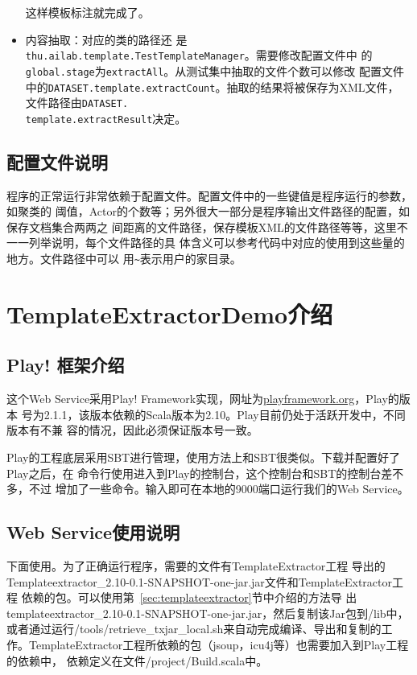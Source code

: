 \documentclass{article}
\begin{document}
\begin{itemize}
  这样模板标注就完成了。
\item 内容抽取：对应的类的路径还
  是\texttt{thu.ailab.template.TestTemplateManager}。需要修改配置文件中
  的\texttt{global.stage}为\texttt{extractAll}。从测试集中抽取的文件个数可以修改
  配置文件中的\texttt{DATASET.template.extractCount}。抽取的结果将被保存为XML文件，
  文件路径由\texttt{DATASET.\\template.extractResult}决定。
\end{itemize}

\subsection{配置文件说明}
程序的正常运行非常依赖于配置文件。配置文件中的一些键值是程序运行的参数，如聚类的
阈值，Actor的个数等；另外很大一部分是程序输出文件路径的配置，如保存文档集合两两之
间距离的文件路径，保存模板XML的文件路径等等，这里不一一列举说明，每个文件路径的具
体含义可以参考代码中对应的使用到这些量的地方。文件路径中可以
用\texttt{\textasciitilde{}}表示用户的家目录。

\section{TemplateExtractorDemo介绍}
\label{sec:templ}

\subsection{Play! 框架介绍}
\label{sec:play}
这个Web Service采用Play! Framework实现，网址为\url{playframework.org}，Play的版本
号为2.1.1，该版本依赖的Scala版本为2.10。Play目前仍处于活跃开发中，不同版本有不兼
容的情况，因此必须保证版本号一致。

Play的工程底层采用SBT进行管理，使用方法上和SBT很类似。下载并配置好了Play之后，在
命令行使用进入到Play的控制台，这个控制台和SBT的控制台差不多，不过
增加了一些命令。输入即可在本地的9000端口运行我们的Web Service。

\subsection{Web Service使用说明}
下面使用。为了正确运行程序，需要的文件有TemplateExtractor工程
导出的Templateextractor\_2.10-0.1-SNAPSHOT-one-jar.jar文件和TemplateExtractor工程
依赖的包。可以使用第~\ref{sec:templateextractor}节中介绍的方法导
出templateextractor\_2.10-0.1-SNAPSHOT-one-jar.jar，然后复制该Jar包到\prj/lib中，
或者通过运行\prj/tools/retrieve\_txjar\_local.sh来自动完成编译、导出和复制的工
作。TemplateExtractor工程所依赖的包（jsoup，icu4j等）也需要加入到Play工程的依赖中，
依赖定义在文件\prj/project/Build.scala中。
\end{document}
